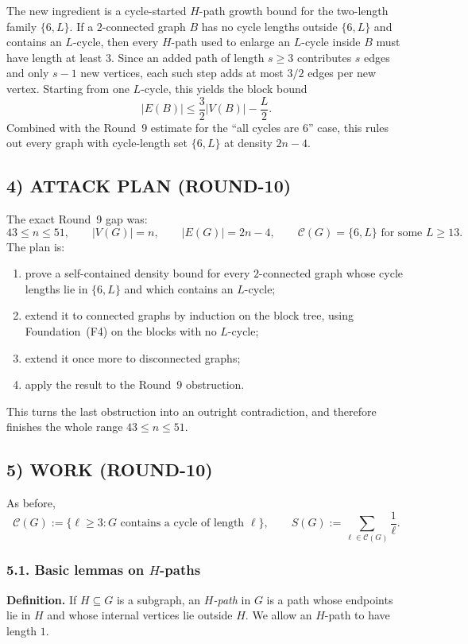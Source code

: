 The new ingredient is a cycle-started $H$-path growth bound for the two-length family $\{6,L\}$.
If a $2$-connected graph $B$ has no cycle lengths outside $\{6,L\}$ and contains an $L$-cycle, then every $H$-path used to enlarge an $L$-cycle inside $B$ must have length at least $3$.
Since an added path of length $s\ge 3$ contributes $s$ edges and only $s-1$ new vertices, each such step adds at most $3/2$ edges per new vertex. Starting from one $L$-cycle, this yields the block bound
\[
|E(B)|\le \frac32|V(B)|-\frac L2.
\]
Combined with the Round~9 estimate for the ``all cycles are $6$'' case, this rules out every graph with cycle-length set $\{6,L\}$ at density $2n-4$.

\subsection*{4) ATTACK PLAN (ROUND-10)}

The exact Round~9 gap was:
\[
43\le n\le 51,
\qquad
|V(G)|=n,
\qquad
|E(G)|=2n-4,
\qquad
\mathcal C(G)=\{6,L\}\text{ for some }L\ge 13.
\]
The plan is:
\begin{enumerate}
\item prove a self-contained density bound for every $2$-connected graph whose cycle lengths lie in $\{6,L\}$ and which contains an $L$-cycle;
\item extend it to connected graphs by induction on the block tree, using Foundation~(F4) on the blocks with no $L$-cycle;
\item extend it once more to disconnected graphs;
\item apply the result to the Round~9 obstruction.
\end{enumerate}
This turns the last obstruction into an outright contradiction, and therefore finishes the whole range $43\le n\le 51$.

\subsection*{5) WORK (ROUND-10)}

As before,
\[
\mathcal C(G):=\{\ell\ge 3:\text{$G$ contains a cycle of length $\ell$}\},
\qquad
S(G):=\sum_{\ell\in\mathcal C(G)}\frac1\ell.
\]

\subsubsection*{5.1. Basic lemmas on $H$-paths}

\textbf{Definition.}
If $H\subseteq G$ is a subgraph, an \emph{$H$-path} in $G$ is a path whose endpoints lie in $H$ and whose internal vertices lie outside $H$. We allow an $H$-path to have length $1$.

